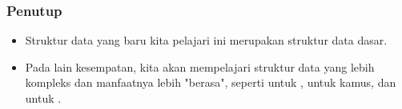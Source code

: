 \begin{frame}
\frametitle{Penutup}
\begin{itemize}
  \item Struktur data yang baru kita pelajari ini merupakan struktur data dasar.
  \item Pada lain kesempatan, kita akan mempelajari struktur data yang lebih kompleks dan manfaatnya lebih "berasa", seperti  untuk ,  untuk kamus, dan  untuk .
\end{itemize}
\end{frame}




